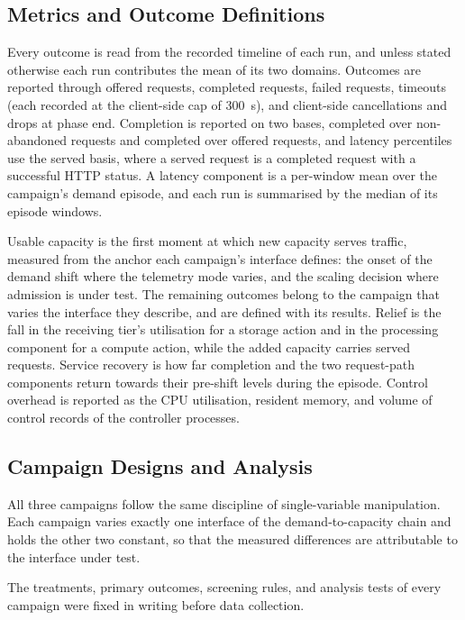 ﻿\documentclass[12pt,reqno,twoside]{amsbook}
\begin{document}
\subsection{Metrics and Outcome Definitions}\label{sec:metrics_definitions}

Every outcome is read from the recorded timeline of each run, and unless
stated otherwise each run contributes the mean of its two domains.
Outcomes are reported through offered requests, completed requests,
failed requests, timeouts (each recorded at the client-side cap of 300~s), and
client-side cancellations and drops at phase end. Completion is reported on two
bases, completed over non-abandoned requests and completed over offered
requests, and latency percentiles use the served basis, where a served request
is a completed request with a successful HTTP status. A latency component is a
per-window mean over the campaign's demand episode, and each run is summarised
by the median of its episode windows.

Usable capacity is the first moment at which new capacity serves traffic,
measured from the anchor each campaign's interface defines: the onset of the
demand shift where the telemetry mode varies, and the scaling decision where
admission is under test. The remaining outcomes belong to the campaign that
varies the interface they describe, and are defined with its results. Relief is
the fall in the receiving tier's utilisation for a storage action and in the
processing component for a compute action, while the added capacity carries
served requests. Service recovery is how far completion and the two request-path
components return towards their pre-shift levels during the episode. Control overhead is reported as the CPU utilisation, resident memory,
and volume of control records of the controller processes.

\subsection{Campaign Designs and Analysis}\label{sec:campaign_analysis}
All three campaigns follow the same discipline of single-variable
manipulation. Each campaign varies exactly one interface of the
demand-to-capacity chain and holds the other two constant, so that the
measured differences are attributable to the interface under test.

The treatments, primary outcomes, screening rules, and analysis tests of every
campaign were fixed in writing before data collection.
\end{document}
